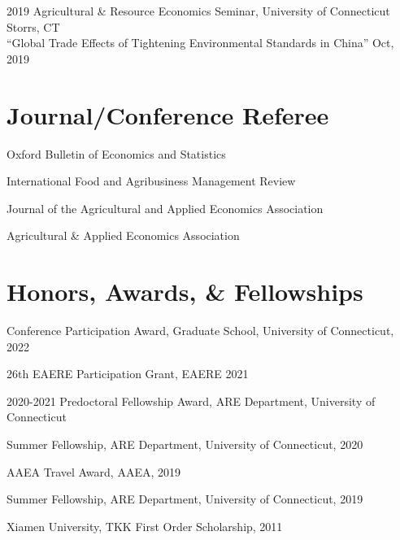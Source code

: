 \documentclass[10.5 pt,letterpaper]{article}
\renewenvironment{itemize}{
	\begin{list}{}{
			\setlength{\leftmargin}{1.5em}
		}
	}{
	\end{list}
}
\begin{document}
\begin{itemize}
		\item[-] 2019  Agricultural \& Resource Economics Seminar, University of Connecticut    \hfill  Storrs, CT\vspace{0.15cm} \\
				``Global Trade Effects of Tightening Environmental Standards in China''  \hfill Oct, 2019
	\end{itemize}	
	
	
	
	\section*{\textbf{Journal/Conference Referee}}
	
	\begin{itemize}
		\item[-]  Oxford Bulletin of Economics and Statistics
		\item[-]  International Food and Agribusiness Management Review
		\item[-] Journal of the Agricultural and Applied Economics Association
		\item[-]  Agricultural \& Applied Economics Association
	\end{itemize}
	
	\section*{\textbf{Honors, Awards, \& Fellowships}}
	
	\begin{itemize}
		\item[-] Conference Participation Award, Graduate School, University of Connecticut, 2022
		\item[-] 26th EAERE Participation Grant, EAERE 2021
		\item[-] 2020-2021 Predoctoral Fellowship Award, ARE Department, University of Connecticut
		\item[-]  Summer  Fellowship, ARE Department, University of Connecticut, 2020
		\item[-] AAEA Travel Award, AAEA, 2019
		\item[-]  Summer  Fellowship, ARE Department, University of Connecticut, 2019
		\item[-] Xiamen University, TKK First Order Scholarship, 2011
		
	\end{itemize}
	
	
\end{document}
